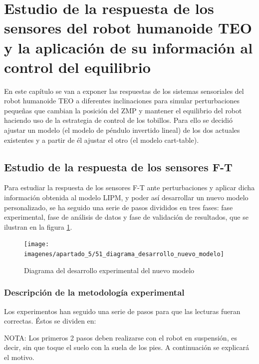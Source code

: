 \section{Estudio de la respuesta de los sensores del robot humanoide TEO y la aplicación de su información al control del equilibrio}

En este capítulo se van a exponer las respuestas de los sistemas sensoriales del robot humanoide TEO a diferentes inclinaciones  para simular perturbaciones pequeñas que cambian la posición del ZMP y mantener el equilibrio del robot haciendo uso de la estrategia de control de los tobillos. Para ello se decidió ajustar un modelo (el modelo de péndulo invertido lineal) de los dos actuales existentes y a partir de él ajustar el otro (el modelo cart-table).

\subsection{Estudio de la respuesta de los sensores F-T}

Para estudiar la respuesta de los sensores F-T ante perturbaciones y aplicar dicha información obtenida al modelo LIPM, y poder así desarrollar un nuevo modelo personalizado, se ha seguido una serie de pasos divididos en tres fases: fase experimental, fase de análisis de datos y fase de validación de resultados, que se ilustran en la figura \ref{figura51}. 

\begin{figure}[H]
\centering
\texttt{[image: imagenes/apartado\_5/51\_diagrama\_desarrollo\_nuevo\_modelo]}
\caption{Diagrama del desarrollo experimental del nuevo modelo \cite{ref21}}
\label{figura51}
\end{figure}

\subsubsection{Descripción de la metodología experimental}

Los experimentos han seguido una serie de pasos para que las lecturas fueran correctas. Éstos se dividen en:

NOTA: Los primeros 2 pasos deben realizarse con el robot en suspensión, es decir, sin que toque el suelo con la suela de los pies. A continuación se explicará el motivo.

